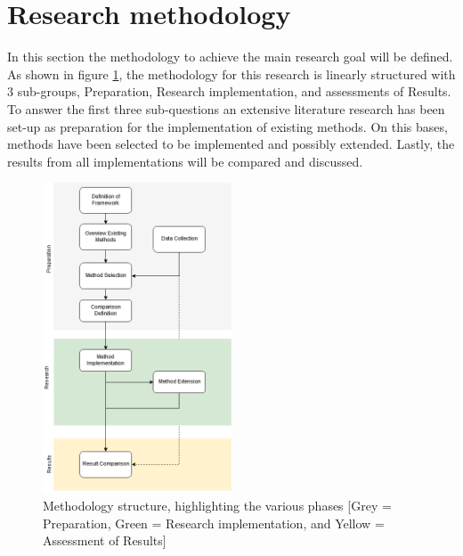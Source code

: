 \section{Research methodology} \label{sec:met}

In this section the methodology to achieve the main research goal will be defined. As shown in figure \ref{fig:met}, the methodology for this research is linearly structured with 3 sub-groups, Preparation, Research implementation, and assessments of Results. To answer the first three sub-questions an extensive literature research has been set-up as preparation for the implementation of existing methods. On this bases, methods have been selected to be implemented and possibly extended. Lastly, the results from all implementations will be compared and discussed.\\

\begin{figure}[!h]
	\centering
	\captionsetup{justification=raggedright,singlelinecheck=false}
	\includegraphics[width=0.50\textwidth]{figs/method1.png}
	\caption{\footnotesize{Methodology structure, highlighting the various phases [Grey = Preparation, Green = Research implementation, and Yellow = Assessment of Results]}}
	\label{fig:met}
\end{figure}

